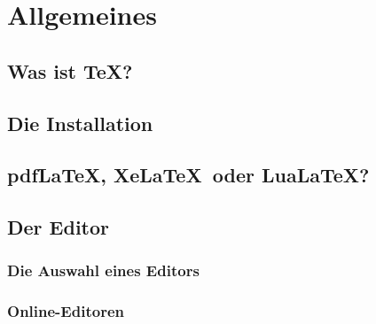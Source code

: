 \chapter{Allgemeines}

\section{Was ist \TeX?}
\section{Die Installation}
\section{pdf\LaTeX , Xe\LaTeX\ oder Lua\LaTeX ?}
\section{Der Editor}
\subsection{Die Auswahl eines Editors}
\subsection{Online-Editoren}
